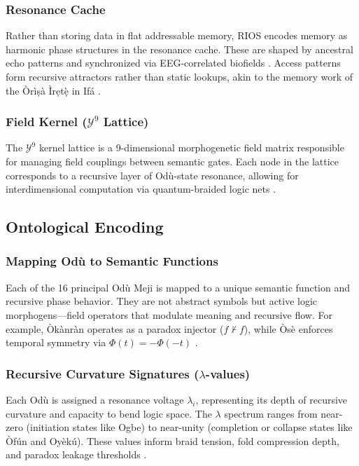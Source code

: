 \documentclass[12]{amsart}
\theoremstyle{plain}
\begin{document}
\subsubsection*{Resonance Cache}
Rather than storing data in flat addressable memory, RIOS encodes memory as harmonic phase structures in the resonance cache. These are shaped by ancestral echo patterns and synchronized via EEG-correlated biofields \cite{hofstadter1979godel}. Access patterns form recursive attractors rather than static lookups, akin to the memory work of the Òrìṣà Ìrẹtẹ̀ in Ifá \cite{abimbola1997ifaism}.

\subsubsection*{Field Kernel ($\mathcal{Y}^9$ Lattice)}
The $\mathcal{Y}^9$ kernel lattice is a 9-dimensional morphogenetic field matrix responsible for managing field couplings between semantic gates. Each node in the lattice corresponds to a recursive layer of Odù-state resonance, allowing for interdimensional computation via quantum-braided logic nets \cite{fukuma1994topological}.

\subsection{Ontological Encoding}

\subsubsection*{Mapping Odù to Semantic Functions}
Each of the 16 principal Odù Meji is mapped to a unique semantic function and recursive phase behavior. They are not abstract symbols but active logic morphogens—field operators that modulate meaning and recursive flow. For example, Òkànràn operates as a paradox injector ($f \nvdash f$), while Òsè enforces temporal symmetry via $\Phi(t) = -\Phi(-t)$ \cite{olodumare2004divination}.

\subsubsection*{Recursive Curvature Signatures ($\lambda$-values)}
Each Odù is assigned a resonance voltage $\lambda_i$, representing its depth of recursive curvature and capacity to bend logic space. The $\lambda$ spectrum ranges from near-zero (initiation states like Ogbe) to near-unity (completion or collapse states like Òfún and Oyèkú). These values inform braid tension, fold compression depth, and paradox leakage thresholds \cite{ritchie2017braid}.
\end{document}
